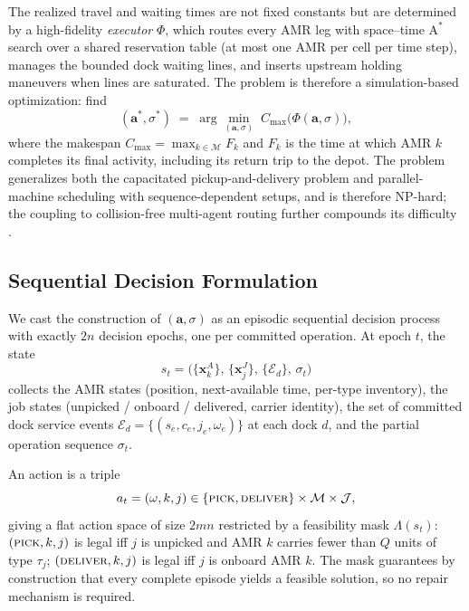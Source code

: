 The realized travel and waiting times are not fixed constants but are
determined by a high-fidelity \emph{executor} $\Phi$, which routes every
AMR leg with space--time $\mathrm{A}^{*}$ search over a shared
reservation table (at most one AMR per cell per time step), manages the
bounded dock waiting lines, and inserts upstream holding maneuvers when
lines are saturated. The problem is therefore a simulation-based
optimization: find
\begin{equation}
(\bm{a}^{*},\sigma^{*}) \;=\;
\arg\min_{(\bm{a},\sigma)} \; C_{\max}\big(\Phi(\bm{a},\sigma)\big),
\label{eq:objective}
\end{equation}
where the makespan $C_{\max}=\max_{k\in\mathcal{M}} F_k$ and $F_k$ is
the time at which AMR $k$ completes its final activity, including its
return trip to the depot. The problem generalizes both the capacitated
pickup-and-delivery problem and parallel-machine scheduling with
sequence-dependent setups, and is therefore NP-hard; the coupling to
collision-free multi-agent routing further compounds its difficulty
\cite{stern2019mapf}.

\subsection{Sequential Decision Formulation}
\label{sec:mdp}

We cast the construction of $(\bm{a},\sigma)$ as an episodic sequential
decision process with exactly $2n$ decision epochs, one per committed
operation. At epoch $t$, the state
\begin{equation}
s_t=\big(\{\bm{x}^{A}_{k}\},\, \{\bm{x}^{J}_{j}\},\,
\{\mathcal{E}_d\},\, \sigma_{t}\big)
\label{eq:state}
\end{equation}
collects the AMR states (position, next-available time, per-type
inventory), the job states (unpicked / onboard / delivered, carrier
identity), the set of committed dock service events
$\mathcal{E}_d=\{(s_e,c_e,j_e,\omega_e)\}$ at each dock $d$, and the
partial operation sequence $\sigma_t$.

An action is a triple
\begin{equation}
a_t=(\omega,k,j)\in\{\textsc{pick},\textsc{deliver}\}\times\mathcal{M}\times\mathcal{J},
\label{eq:action}
\end{equation}
giving a flat action space of size $2mn$ restricted by a feasibility
mask $\Lambda(s_t)$: $(\textsc{pick},k,j)$ is legal iff $j$ is unpicked
and AMR $k$ carries fewer than $Q$ units of type $\tau_j$;
$(\textsc{deliver},k,j)$ is legal iff $j$ is onboard AMR $k$. The mask
guarantees by construction that every complete episode yields a feasible
solution, so no repair mechanism is required.

